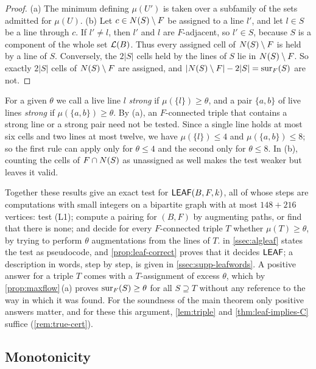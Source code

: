 \begin{proof}
(a) The minimum defining $\mu(U')$ is taken over a subfamily of the sets admitted for $\mu(U)$. (b) Let
$c\in N(S)\setminus F$ be assigned to a line $l'$, and let $l\in S$ be a line through $c$. If $l'\ne l$,
then $l'$ and $l$ are $F$-adjacent, so $l'\in S$, because $S$ is a component of the whole set $\mathcal{L}(B)$.
Thus every assigned cell of $N(S)\setminus F$ is held by a line of $S$. Conversely, the $2|S|$ cells held
by the lines of $S$ lie in $N(S)\setminus F$. So exactly $2|S|$ cells of $N(S)\setminus F$ are assigned,
and $|N(S)\setminus F|-2|S|=\operatorname{sur}_F(S)$ are not.
\end{proof}

For a given $\theta$ we call a live line $l$ \emph{strong} if $\mu(\{l\})\ge\theta$, and a pair
$\{a,b\}$ of live lines \emph{strong} if $\mu(\{a,b\})\ge\theta$. By (a), an $F$-connected triple that
contains a strong line or a strong pair need not be tested. Since a single line holds at most six cells
and two lines at most twelve, we have $\mu(\{l\})\le 4$ and
$\mu(\{a,b\})\le 8$; so the first rule can apply only for $\theta\le 4$ and the second only for
$\theta\le 8$. In (b), counting the cells of $F\cap N(S)$ as unassigned as well makes the test weaker but
leaves it valid.

Together these results give an exact test for $\mathsf{LEAF}(B,F,k)$, all of whose steps are computations with
small integers on a bipartite graph with at most $148+216$ vertices: test (L1); compute a pairing for
$(B,F)$ by augmenting paths, or find that there is none; and decide for every $F$-connected triple $T$
whether $\mu(T)\ge\theta$, by trying to perform $\theta$ augmentations from the lines of $T$.
 in \cref{ssec:algleaf} states the test as pseudocode, and \cref{prop:leaf-correct} proves
that it decides $\mathsf{LEAF}$; a description in words, step by step, is given in \cref{ssec:supp-leafwords}. A
positive answer for a triple $T$ comes with a $T$-assignment of excess $\theta$, which by
\cref{prop:maxflow}\,(a) proves $\operatorname{sur}_F(S)\ge\theta$ for all $S\supseteq T$ without any reference to the
way in which it was found. For the soundness of the main theorem only positive answers matter, and for
these this argument, \cref{lem:triple} and \cref{thm:leaf-implies-C} suffice (\cref{rem:true-cert}).

\subsection{Monotonicity}\label{ssec:monotone}

